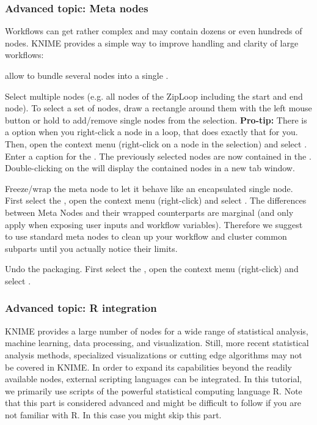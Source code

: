 \subsubsection{Advanced topic: Meta nodes}

Workflows can get rather complex and may contain dozens or even hundreds of nodes. KNIME provides a simple way to improve handling and clarity of large workflows:

 allow to bundle several nodes into a single .

\begin{task}
Select multiple nodes (e.g. all nodes of the ZipLoop including the start and end node). To select a set of nodes, draw a rectangle around them with the left mouse button or hold  to add/remove single nodes from the selection. \textbf{Pro-tip:} There is a  option when you right-click a node in a loop, that does exactly that for you. Then, open the context menu (right-click on a node in the selection) and select . Enter a caption for the . The previously selected nodes are now contained in the . Double-clicking on the  will display the contained nodes in a new tab window. 
\end{task}

\begin{task}
Freeze/wrap the meta node to let it behave like an encapsulated single node. First select the , 
open the context menu (right-click) and select . The differences between Meta Nodes and their 
wrapped counterparts are marginal (and only apply when exposing user inputs and workflow variables). Therefore we 
suggest to use standard meta nodes to clean up your workflow and cluster common subparts until you actually notice 
their limits.
\end{task}

\begin{task}
Undo the packaging. First select the , open the context menu (right-click) and select .
\end{task}

\subsubsection{Advanced topic: R integration}

KNIME provides a large number of nodes for a wide range of statistical analysis, machine learning, data processing, 
and visualization. Still, more recent statistical analysis methods, specialized visualizations or cutting edge 
algorithms may not be covered in KNIME. In order to expand its capabilities beyond the readily available nodes, 
external scripting languages can be integrated. In this tutorial, we primarily use scripts of the powerful 
statistical computing language R. Note that this part is considered advanced and might be difficult to follow if you 
are not familiar with R. In this case you might skip this part.

